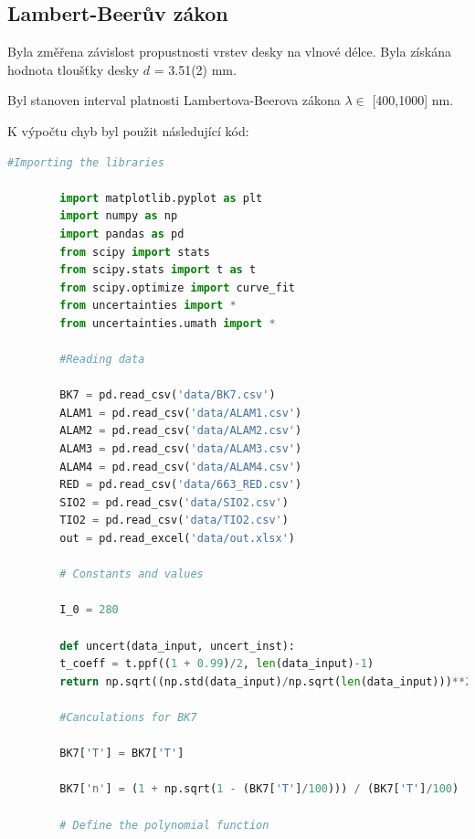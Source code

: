 \documentclass[a4paper,11pt]{article}
\begin{document}
\begin{minipage}[t]{0.5\textwidth}
            \subsection{Lambert-Beerův zákon}
                Byla změřena závislost propustnosti vrstev desky na vlnové délce. Byla získána hodnota tloušťky desky $d$ = 3.51(2) mm.
                \par Byl stanoven interval platnosti Lambertova-Beerova zákona $\lambda \in$ [400,1000] nm.
    \end{minipage}
    \hspace{10pt}
    \begin{minipage}[t]{0.5\textwidth} 
    \end{minipage}
\newpage
    \par K výpočtu chyb byl použit následující kód: 
    \begin{lstlisting}[language=Python, basicstyle=\tiny, breaklines=true, postbreak=\mbox{\textbackslashspace}]
        #Importing the libraries

        import matplotlib.pyplot as plt
        import numpy as np
        import pandas as pd
        from scipy import stats
        from scipy.stats import t as t 
        from scipy.optimize import curve_fit
        from uncertainties import *
        from uncertainties.umath import *
        
        #Reading data

        BK7 = pd.read_csv('data/BK7.csv')
        ALAM1 = pd.read_csv('data/ALAM1.csv')
        ALAM2 = pd.read_csv('data/ALAM2.csv')
        ALAM3 = pd.read_csv('data/ALAM3.csv')
        ALAM4 = pd.read_csv('data/ALAM4.csv')
        RED = pd.read_csv('data/663_RED.csv')
        SIO2 = pd.read_csv('data/SIO2.csv')
        TIO2 = pd.read_csv('data/TIO2.csv')
        out = pd.read_excel('data/out.xlsx')

        # Constants and values

        I_0 = 280 

        def uncert(data_input, uncert_inst):
        t_coeff = t.ppf((1 + 0.99)/2, len(data_input)-1)
        return np.sqrt((np.std(data_input)/np.sqrt(len(data_input)))**2 + uncert_inst**2)*t_coeff

        #Canculations for BK7

        BK7['T'] = BK7['T']

        BK7['n'] = (1 + np.sqrt(1 - (BK7['T']/100))) / (BK7['T']/100)

        # Define the polynomial function


\end{lstlisting}
\end{document}
